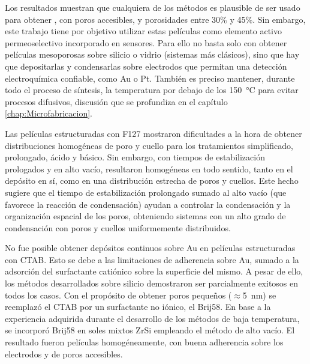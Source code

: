 	Los resultados muestran que cualquiera de los métodos es plausible de ser usado para obtener \pdm, con poros accesibles, y porosidades entre 30\% y 45\%. Sin embargo, este trabajo tiene por objetivo utilizar estas películas como elemento activo permeoselectivo incorporado en sensores. Para ello no basta solo con obtener películas mesoporosas sobre silicio o vidrio (sistemas más clásicos), sino que hay que depositarlas y condensarlas sobre electrodos que permitan una detección electroquímica confiable, como Au o Pt. También es preciso mantener, durante todo el proceso de síntesis, la temperatura por debajo de los \SI{150}{\celsius} para evitar procesos difusivos, discusión que se profundiza en el capítulo \ref{chap:Microfabricacion}.

	Las películas estructuradas con F127 mostraron dificultades a la hora de obtener distribuciones homogéneas de poro y cuello para los tratamientos simplificado, prolongado, ácido y básico. Sin embargo, con tiempos de estabilización prologados y en alto vacío, resultaron homogéneas en todo sentido, tanto en el depósito en sí, como en una distribución estrecha de poros y cuellos. Este hecho sugiere que el tiempo de estabilización prolongado sumado al alto vacío (que favorece la reacción de condensación) ayudan a controlar la condensación y la organización espacial de los poros, obteniendo sistemas con un alto grado de condensación con poros y cuellos uniformemente distribuidos.

	No fue posible obtener depósitos continuos sobre Au en películas estructuradas con CTAB. Esto se debe a las limitaciones de adherencia sobre Au, sumado a la adsorción del surfactante catiónico sobre la superficie del mismo. A pesar de ello, los métodos desarrollados sobre silicio demostraron ser parcialmente exitosos en todos los casos. Con el propósito de obtener poros pequeños ($\approx$\SI{5}{\nm}) se reemplazó el CTAB por un surfactante no iónico, el Brij58. En base a la experiencia adquirida durante el desarrollo de los métodos de baja temperatura, se incorporó Brij58 en soles mixtos Zr\textbar Si empleando el método de alto vacío. El resultado fueron películas homogéneamente, con buena adherencia sobre los electrodos y de poros accesibles.

